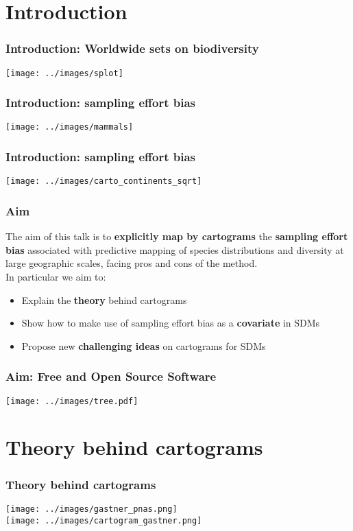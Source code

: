 \documentclass{beamer}
\begin{document}
\section{Introduction}
\begin{frame}
\frametitle{Introduction: Worldwide sets on biodiversity}
\centering
\texttt{[image: ../images/splot]}\\
 \end{frame}

 \begin{frame}
\frametitle{Introduction: sampling effort bias}
\centering
\texttt{[image: ../images/mammals]}\\
 \end{frame}

  \begin{frame}
\frametitle{Introduction: sampling effort bias}
\centering
\texttt{[image: ../images/carto\_continents\_sqrt]}\\
 \end{frame}

\begin{frame}
\frametitle{Aim}
The aim of this talk is to \textbf{explicitly map by cartograms} the \textbf{sampling effort bias} associated with predictive mapping of species distributions and diversity at large geographic scales, facing pros and cons of the method.
\\
\bigskip
\pause In particular we aim to:
\begin{itemize}
\item \pause Explain the \textbf{theory} behind cartograms
\item \pause Show how to make use of sampling effort bias as a \textbf{covariate} in SDMs
\item \pause Propose new \textbf{challenging ideas} on cartograms for SDMs
\end{itemize}
\end{frame}

\begin{frame}
 \frametitle{Aim: Free and Open Source Software}
\centering
\texttt{[image: ../images/tree.pdf]}
\end{frame}


\section{Theory behind cartograms}
\begin{frame}
\frametitle{Theory behind cartograms}
\centering
\texttt{[image: ../images/gastner\_pnas.png]}\\
\texttt{[image: ../images/cartogram\_gastner.png]}\\
\end{frame}
 
\end{document}
